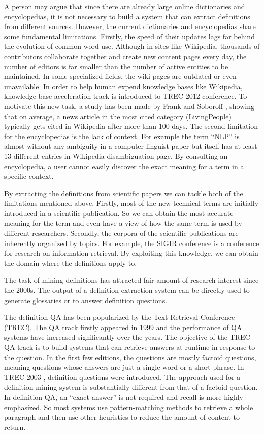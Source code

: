 \documentclass[hyp]{socreport}
\begin{document}
\noindent
A person may argue that since there are already large online dictionaries and encyclopedias, it is not necessary to build a system that can extract definitions from different sources. However, the current dictionaries and encyclopedias share some fundamental limitations. Firstly, the speed of their updates lags far behind the evolution of common word use. Although in sites like Wikipedia, thousands of contributors collaborate together and create new content pages every day, the number of editors is far smaller than the number of active entities to be maintained. In some specialized fields, the wiki pages are outdated or even unavailable. In order to help human expend knowledge bases like Wikipedia, knowledge base acceleration track is introduced to TREC 2012 conference. To motivate this new task, a study has been made by Frank and Soboroff \cite{Frank12}, showing that on average, a news article in the most cited category (LivingPeople) typically gets cited in Wikipedia after more than 100 days. The second limitation for the encyclopedias is the lack of context. For example the term ``NLP'' is almost without any ambiguity in a computer linguist paper but itself has at least 13 different entries in Wikipedia disambiguation page. By consulting an encyclopedia, a user cannot easily discover the exact meaning for a term in a specific context.

By extracting the definitions from scientific papers we can tackle both of the limitations mentioned above. Firstly, most of the new technical terms are initially introduced in a scientific publication. So we can obtain the most accurate meaning for the term and even have a view of how the same term is used by different researchers. Secondly, the corpora of the scientific publications are inherently organized by topics. For example, the SIGIR conference is a conference for research on information retrieval. By exploiting this knowledge, we can obtain the domain where the definitions apply to.

The task of mining definitions has attracted fair amount of research interest since the 2000s. The output of a definition extraction system can be directly used to generate glossaries or to answer definition questions. 

The definition QA has been popularized by the Text Retrieval Conference (TREC). The QA track firstly appeared in 1999 and the performance of QA systems have increased significantly over the years. The objective of the TREC QA track is to build systems that can retrieve answers at runtime in response to the question. In the first few editions, the questions are mostly factoid questions, meaning questions whose answers are just a single word or a short phrase. In TREC 2003 \cite{Voorhees03}, definition questions were introduced. The approach used for a definition mining system is substantially different from that of a factoid question. In definition QA, an ``exact answer'' is not required and recall is more highly emphasized. So most systems use pattern-matching methods to retrieve a whole paragraph and then use other heuristics to reduce the amount of content to return. 
\end{document}
